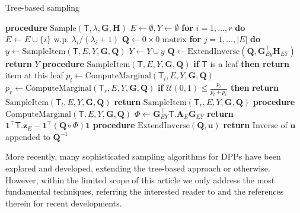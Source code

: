 \begin{algorithm} [H] \label{alg:tree-samp}
\caption{Tree-based sampling}
\begin{algorithmic}[1]
    \State \textbf{procedure} $\mathrm{Sample}(\mathsf{T},\lambda,\mathbf{G},\mathbf{H})$
    \State \quad $E\leftarrow \emptyset, Y \leftarrow \emptyset$
    \State \quad \textbf{for } $i=1,\ldots,r$ \textbf{ do}
    \State \quad \quad $E\leftarrow E\cup\{i\} \text{ w.p. } \lambda_i/(\lambda_i+1)$
    \State \quad $\mathbf{Q}\leftarrow 0\times 0 \text{ matrix}$
    \State \quad \textbf{for } $j=1,\ldots, |E|$ \textbf{ do}
    \State \quad \quad $y \leftarrow \mathrm{SampleItem}(\mathsf{T}, E, Y , \mathbf{G}, \mathbf{Q})$
    \State \quad \quad $Y \leftarrow Y \cup y$
    \State \quad \quad $\mathbf{Q}\leftarrow \mathrm{ExtendInverse}(\mathbf{Q},\mathbf{G}^\top_{Ey}\mathbf{H}_{EY})$
    \State \quad \textbf{return} $Y$
    \State \textbf{procedure} $\mathrm{SampleItem}(\mathsf{T},E,Y,\mathbf{G},\mathbf{Q})$
    \State \quad \textbf{if } $\mathsf{T}$ is a leaf \textbf{then return} item at this leaf
    \State \quad $p_l \leftarrow \mathrm{ComputeMarginal}(\mathsf{T}_l, E , Y, \mathbf{G},\mathbf{Q})$
    \State \quad $p_r \leftarrow \mathrm{ComputeMarginal}(\mathsf{T}_r, E , Y, \mathbf{G},\mathbf{Q})$
    \State \quad \textbf{if } $\mathcal U(0,1) \le \frac{p_l}{p_l + p_r}$ \textbf{ then}
    \State \quad \quad \textbf{return } $\mathrm{SampleItem}(\mathsf{T}_l, E , Y, \mathbf{G},\mathbf{Q})$
    \State \quad \textbf{return } $\mathrm{SampleItem}(\mathsf{T}_r, E , Y, \mathbf{G},\mathbf{Q})$
    \State \textbf{procedure} $\mathrm{ComputeMarginal}(\mathsf{T}, E , Y, \mathbf{G},\mathbf{Q})$
    \State \quad $\Phi \leftarrow \mathbf{G}_{EY}^\top \mathsf{T}.\mathbf{A}_E \mathbf{G}_{EY} $
    \State \quad \textbf{return } $\mathbf{1}^\top \mathsf{T}.\mathbf{z}_E - \mathbf{1}^\top (\mathbf{Q} \circ \Phi) \mathbf{1}$
    \State \textbf{procedure} $\mathrm{ExtendInverse}(\mathbf{Q},\mathbf{u})$
    \State \quad \textbf{return} Inverse of $\mathbf{u}$ appended to $\mathbf{Q}^{-1}$
\end{algorithmic}
\end{algorithm}

More recently, many sophisticated sampling algorithms for DPPs have been explored and developed, extending the tree-based approach or otherwise. 
However, within the limited scope of this article we only address the most fundamental techniques, referring the interested reader to \cite{gartrell_scalablesampling, han2022scalable,kulesza-gillenwater, Tremblay-samplingdpp,anari-samplingdpp} and the references therein for recent developments. 
